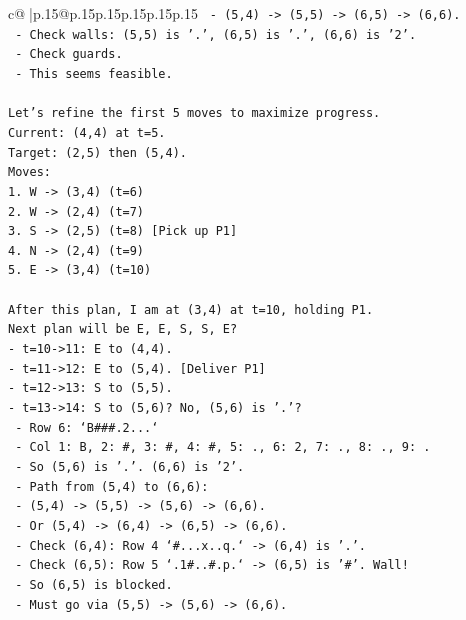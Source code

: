\documentclass{article}
\begin{document}
{\begin{supertabular}{c@{$\;$}|p{.15\linewidth}@{}p{.15\linewidth}p{.15\linewidth}p{.15\linewidth}p{.15\linewidth}p{.15\linewidth}}
{{{\texttt{  {-} (5,4) {-}> (5,5) {-}> (6,5) {-}> (6,6).} \\
\texttt{  {-} Check walls: (5,5) is '.', (6,5) is '.', (6,6) is '2'.} \\
\texttt{  {-} Check guards.} \\
\texttt{  {-} This seems feasible.} \\
\\ 
\texttt{Let's refine the first 5 moves to maximize progress.} \\
\texttt{Current: (4,4) at t=5.} \\
\texttt{Target: (2,5) then (5,4).} \\
\texttt{Moves:} \\
\texttt{1. W {-}> (3,4) (t=6)} \\
\texttt{2. W {-}> (2,4) (t=7)} \\
\texttt{3. S {-}> (2,5) (t=8) {[}Pick up P1{]}} \\
\texttt{4. N {-}> (2,4) (t=9)} \\
\texttt{5. E {-}> (3,4) (t=10)} \\
\\ 
\texttt{After this plan, I am at (3,4) at t=10, holding P1.} \\
\texttt{Next plan will be E, E, S, S, E?} \\
\texttt{{-} t=10{-}>11: E to (4,4).} \\
\texttt{{-} t=11{-}>12: E to (5,4). {[}Deliver P1{]}} \\
\texttt{{-} t=12{-}>13: S to (5,5).} \\
\texttt{{-} t=13{-}>14: S to (5,6)? No, (5,6) is '.'?} \\
\texttt{  {-} Row 6: `B\#\#\#.2...`} \\
\texttt{  {-} Col 1: B, 2: \#, 3: \#, 4: \#, 5: ., 6: 2, 7: ., 8: ., 9: .} \\
\texttt{  {-} So (5,6) is '.'. (6,6) is '2'.} \\
\texttt{  {-} Path from (5,4) to (6,6):} \\
\texttt{    {-} (5,4) {-}> (5,5) {-}> (5,6) {-}> (6,6).} \\
\texttt{    {-} Or (5,4) {-}> (6,4) {-}> (6,5) {-}> (6,6).} \\
\texttt{    {-} Check (6,4): Row 4 `\#...x..q.` {-}> (6,4) is '.'.} \\
\texttt{    {-} Check (6,5): Row 5 `.1\#..\#.p.` {-}> (6,5) is '\#'. Wall!} \\
\texttt{    {-} So (6,5) is blocked.} \\
\texttt{    {-} Must go via (5,5) {-}> (5,6) {-}> (6,6).} \\
}}}
\end{supertabular}}
\end{document}

